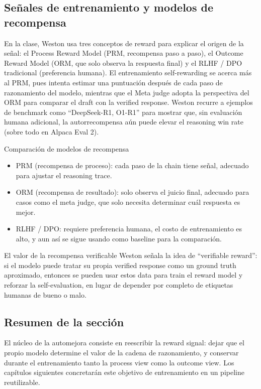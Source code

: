\documentclass[a4paper]{article}
\begin{document}
\subsection{Señales de entrenamiento y modelos de recompensa}
En la clase, Weston usa tres conceptos de reward para explicar el origen de la señal: el Process Reward Model (PRM, recompensa paso a paso), el Outcome Reward Model (ORM, que solo observa la respuesta final) y el RLHF / DPO tradicional (preferencia humana). El entrenamiento self-rewarding se acerca más al PRM, pues intenta estimar una puntuación después de cada paso de razonamiento del modelo, mientras que el Meta judge adopta la perspectiva del ORM para comparar el draft con la verified response. Weston recurre a ejemplos de benchmark como ``DeepSeek-R1, O1-R1'' para mostrar que, sin evaluación humana adicional, la autorrecompensa aún puede elevar el reasoning win rate (sobre todo en Alpaca Eval 2).

\begin{importantbox}{Comparación de modelos de recompensa}
\begin{itemize}
    \item PRM (recompensa de proceso): cada paso de la chain tiene señal, adecuado para ajustar el reasoning trace.
    \item ORM (recompensa de resultado): solo observa el juicio final, adecuado para casos como el meta judge, que solo necesita determinar cuál respuesta es mejor.
    \item RLHF / DPO: requiere preferencia humana, el costo de entrenamiento es alto, y aun así se sigue usando como baseline para la comparación.
\end{itemize}
\end{importantbox}

\begin{knowledgebox}{El valor de la recompensa verificable}
Weston señala la idea de ``verifiable reward'': si el modelo puede tratar su propia verified response como un ground truth aproximado, entonces se pueden usar estos data para train el reward model y reforzar la self-evaluation, en lugar de depender por completo de etiquetas humanas de bueno o malo.
\end{knowledgebox}

\subsection{Resumen de la sección}
El núcleo de la automejora consiste en reescribir la reward signal: dejar que el propio modelo determine el valor de la cadena de razonamiento, y conservar durante el entrenamiento tanto la process view como la outcome view. Los capítulos siguientes concretarán este objetivo de entrenamiento en un pipeline reutilizable.
\end{document}
